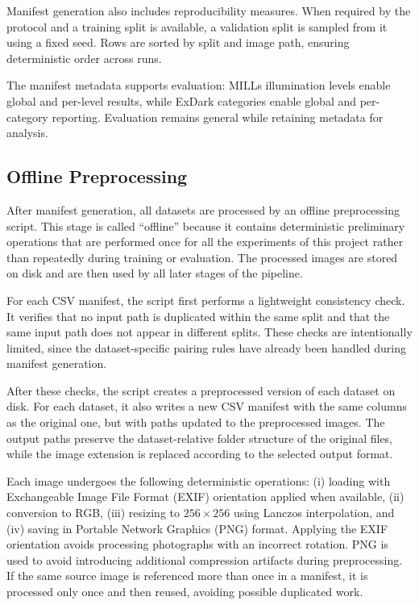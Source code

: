 Manifest generation also includes reproducibility measures. When required by the protocol and a training split is available, a validation split is sampled from it using a fixed seed. Rows are sorted by split and image path, ensuring deterministic order across runs.

The manifest metadata supports evaluation: MILLs illumination levels enable global and per-level results, while ExDark categories enable global and per-category reporting. Evaluation remains general while retaining metadata for analysis.

\subsection{Offline Preprocessing}

After manifest generation, all datasets are processed by an offline preprocessing script. This stage is called ``offline'' because it contains deterministic preliminary operations that are performed once for all the experiments of this project rather than repeatedly during training or evaluation. The processed images are stored on disk and are then used by all later stages of the pipeline.

For each CSV manifest, the script first performs a lightweight consistency check. It verifies that no input path is duplicated within the same split and that the same input path does not appear in different splits. These checks are intentionally limited, since the dataset-specific pairing rules have already been handled during manifest generation.

After these checks, the script creates a preprocessed version of each dataset on disk. For each dataset, it also writes a new CSV manifest with the same columns as the original one, but with paths updated to the preprocessed images. The output paths preserve the dataset-relative folder structure of the original files, while the image extension is replaced according to the selected output format.

Each image undergoes the following deterministic operations: (i) loading with Exchangeable Image File Format (EXIF) orientation applied when available, (ii) conversion to RGB, (iii) resizing to $256 \times 256$ using Lanczos interpolation, and (iv) saving in Portable Network Graphics (PNG) format. Applying the EXIF orientation avoids processing photographs with an incorrect rotation. PNG is used to avoid introducing additional compression artifacts during preprocessing. If the same source image is referenced more than once in a manifest, it is processed only once and then reused, avoiding possible duplicated work.

